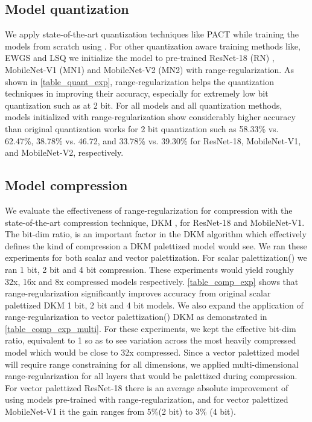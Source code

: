 \documentclass[10pt,twocolumn,letterpaper]{article}
\begin{document}
\subsection{Model quantization}
We apply state-of-the-art quantization techniques like PACT \cite{choi2018pact} while training the models from scratch using . For other quantization aware training methods like, EWGS \cite{lee2021network} and LSQ \cite{esser2019learned} we initialize the model to pre-trained ResNet-18 (RN) \cite{he2016deep}, MobileNet-V1 (MN1) \cite{howard2017mobilenets} and MobileNet-V2 (MN2) \cite{sandler2018mobilenetv2} with range-regularization. As shown in \cref{table_quant_exp}, range-regularization helps the quantization techniques in improving their accuracy, especially for extremely low bit quantization such as at 2 bit. For all models and all quantization methods, models initialized with range-regularization show considerably higher accuracy than original quantization works for 2 bit quantization such as 58.33\% vs. 62.47\%, 38.78\% vs. 46.72, and 33.78\% vs. 39.30\% for ResNet-18, MobileNet-V1, and MobileNet-V2, respectively.


\subsection{Model compression}
We evaluate the effectiveness of range-regularization for compression with the state-of-the-art compression technique, DKM \cite{cho2021dkm}, for ResNet-18 and MobileNet-V1. The bit-dim ratio,  is an important factor in the DKM algorithm which effectively defines the kind of compression a DKM palettized model would see. We ran these experiments for both scalar and vector palettization. For scalar palettization() we ran 1 bit, 2 bit and 4 bit compression. These experiments would yield roughly 32x, 16x and 8x compressed models respectively. \cref{table_comp_exp} shows that range-regularization significantly improves accuracy from original scalar palettized DKM 1 bit, 2 bit and 4 bit models. We also expand the application of range-regularization to vector palettization() DKM \cite{cho2021dkm} as demonstrated in \cref{table_comp_exp_multi}. For these experiments, we kept the effective bit-dim ratio,  equivalent to 1 so as to see variation across the most heavily compressed model which would be close to 32x compressed. Since a vector palettized model will require range constraining for all dimensions, we applied multi-dimensional range-regularization for all layers that would be palettized during compression. For vector palettized ResNet-18 there is an average absolute improvement of  using models pre-trained with range-regularization, and for vector palettized MobileNet-V1 it the gain ranges from 5\%(2 bit) to 3\% (4 bit). 
\end{document}
